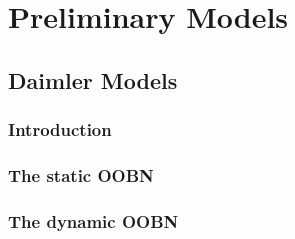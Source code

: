 \section{Preliminary Models}
\subsection{Daimler Models}

\subsubsection*{Introduction}





\subsubsection*{The static OOBN}


\subsubsection*{The dynamic OOBN}

